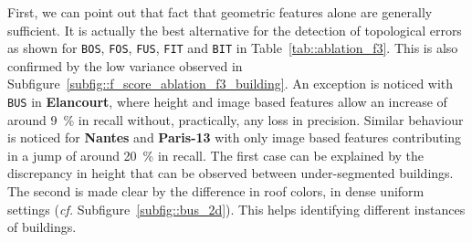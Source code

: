         \begin{figure}[htpb]
            \centering
        \end{figure}

        First, we can point out that fact that geometric features alone are generally sufficient.
        It is actually the best alternative for the detection of topological errors as shown for \texttt{BOS}, \texttt{FOS}, \texttt{FUS}, \texttt{FIT} and \texttt{BIT} in Table~\ref{tab::ablation_f3}.
        This is also confirmed by the low variance observed in Subfigure~\ref{subfig::f_score_ablation_f3_building}.
        An exception is noticed with \texttt{BUS} in \textbf{Elancourt}, where height and image based features allow an increase of around \SI{9}{\percent} in recall without, practically, any loss in precision.
        Similar behaviour is noticed for \textbf{Nantes} and \textbf{Paris-13} with only image based features contributing in a jump of around \SI{20}{\percent} in recall.
        The first case can be explained by the discrepancy in height that can be observed between under-segmented buildings.
        The second is made clear by the difference in roof colors, in dense uniform settings (\textit{cf.} Subfigure~\ref{subfig::bus_2d}).
        This helps identifying different instances of buildings.\\

